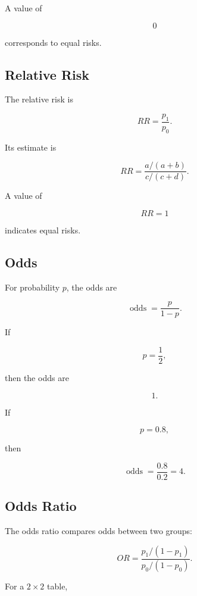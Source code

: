 A value of

\[
0
\]

corresponds to equal risks.

\subsection{Relative Risk}
\label{subsec:relative-risk}

The relative risk is

\[
\boxed{
RR
=
\frac{
p_1
}{
p_0
}.
}
\]

Its estimate is

\[
\boxed{
\widehat{RR}
=
\frac{
a/(a+b)
}{
c/(c+d)
}.
}
\]

A value of

\[
\boxed{
RR=1
}
\]

indicates equal risks.

\subsection{Odds}
\label{subsec:odds}

For probability \(p\), the odds are

\[
\boxed{
\operatorname{odds}
=
\frac{
p
}{
1-p
}.
}
\]

If

\[
p=\frac12,
\]

then the odds are

\[
1.
\]

If

\[
p=0.8,
\]

then

\[
\boxed{
\operatorname{odds}
=
\frac{0.8}{0.2}
=
4.
}
\]

\subsection{Odds Ratio}
\label{subsec:odds-ratio}

The odds ratio compares odds between two groups:

\[
\boxed{
OR
=
\frac{
p_1/(1-p_1)
}{
p_0/(1-p_0)
}.
}
\]

For a \(2\times2\) table,

